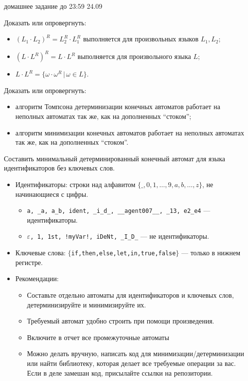 \documentclass[12pt]{article}
\begin{document}

{\Large домашнее задание до 23:59 24.09}
\bigskip

\enumerate
{
  \item 
  {   
    Доказать или опровергнуть:
    \begin{itemize}
        \item { $( L_1 \cdot L_2 )^R = L_2^R \cdot L_1^R $ выполняется для произвольных языков $L_1, L_2$; }
        \item { $ (L \cdot L^R)^R = L \cdot L^R $ выполняется для произвольного языка $L$; }
        \item { $ L \cdot L^R = \{ \omega \cdot \omega^R \,|\, \omega \in L  \} $. }
    \end{itemize}
  }
  \item
  {
    Доказать или опровергнуть: 
    \begin{itemize}
      \item алгоритм Томпсона детерминизации конечных автоматов работает на неполных автоматах так же, как на дополненных ``стоком'';
      \item алгоритм минимизации конечных автоматов работает на неполных автоматах так же, как на дополненных ``стоком''.
    \end{itemize}
  }
  \item
  {
    Составить минимальный детерминированный конечный автомат для языка идентификаторов без ключевых слов. 
    \begin{itemize}
        \item Идентификаторы: строки над алфавитом $\{\_,0,1,\dots,9,a,b,\dots,z\}$, не начинающиеся с цифры.
        \begin{itemize}
            \item \verb;a, _a, a_b, ident, _i_d_, __agent007__, _13, e2_e4; --- идентификаторы.
            \item $\varepsilon$\verb;, 1, 1st, !myVar!, iDeNt, _I_D_; --- не идентификаторы.
        \end{itemize}
        \item Ключевые слова: $\{$\verb;if,then,else,let,in,true,false;$\}$ --- только в нижнем регистре.
        \item Рекомендации:
        \begin{itemize}
            \item Составьте отдельно автоматы для идентификаторов и ключевых слов, детерминизируйте и минимизируйте их.
            \item Требуемый автомат удобно строить при помощи произведения.
            \item Включите в отчет все промежуточные автоматы
            \item Можно делать вручную, написать код для минимизации/детерминизации или найти библиотеку, которая делает все требуемые операции за вас. Если в деле замешан код, присылайте ссылки на репозитории.
        \end{itemize}
    \end{itemize}
  }
}
\end{document}
